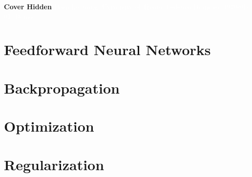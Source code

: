 \documentclass[11pt,fleqn,oneside]{book} %
\newcommand{\AUTHOR}{Federico Brancasi}
\newcommand{\DATE}{\today}
\newcommand{\TITLE}{Deep Learning}
\newcommand{\SUBTITLE}{University of Trento}
\newcommand{\SUBJECT}{Demo}
\renewcommand{\coverpage}[5]{{\Huge\textbf{Cover Hidden}}
    \textcolor{white}{#1, #2, #3, #4, #5}}
\begin{document}

\coverpage{\TITLE}{\SUBTITLE}{\AUTHOR}{\DATE}{\SUBJECT}

\newpage
\tableofcontents


\newpage
\chapter{Feedforward Neural Networks} 


\newpage
\chapter{Backpropagation} 


\newpage
\chapter{Optimization}


\newpage
\chapter{Regularization}


\newpage \ \newpage

\listoffigures
\listoftables

\end{document}
